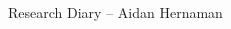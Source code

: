 \documentclass[11pt,a4paper]{article}
\newcommand{\Title}{Research Diary}
\begin{document}
  \thispagestyle{plain}

  \begin{center}
    {\LARGE\Title{} -- Aidan Hernaman}
  \end{center}

  \vspace{0.5cm}

  \begin{multicols*}{2}
    
  \end{multicols*}
\end{document}
